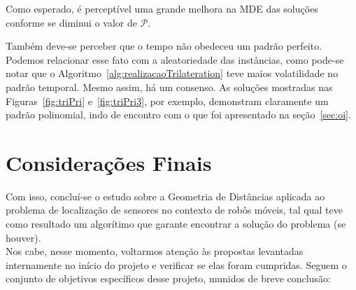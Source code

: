 \documentclass[a4paper,12pt]{report}
\begin{document}
	Como esperado, é perceptível uma grande melhora na MDE das soluções conforme se diminui o valor de $\mathcal{P}$. 
	
	Também deve-se perceber que o tempo não obedeceu um padrão perfeito. Podemos relacionar esse fato com a aleatoriedade das instâncias, como pode-se notar que o Algoritmo~\ref{alg:realizacaoTrilateration} teve maios volatilidade no padrão temporal. Mesmo assim, há um consenso. As soluções mostradas nas Figuras~\ref{fig:triPri} e~\ref{fig:triPri3}, por exemplo, demonstram claramente um padrão polinomial, indo de encontro com o que foi apresentado na seção~\ref{sec:oi}.
	
	\newpage
	\chapter{Considerações Finais}
	Com isso, concluí-se o estudo sobre a Geometria de Distâncias aplicada ao problema de localização de sensores no contexto de robôs móveis, tal qual teve como resultado um algorítimo que garante encontrar a solução do problema (se houver).
	\\
	
	Nos cabe, nesse momento, voltarmos atenção às propostas levantadas internamente no início do projeto e verificar se elas foram cumpridas. Seguem o conjunto de objetivos específicos desse projeto, munidos de breve conclusão:
	
\end{document}
